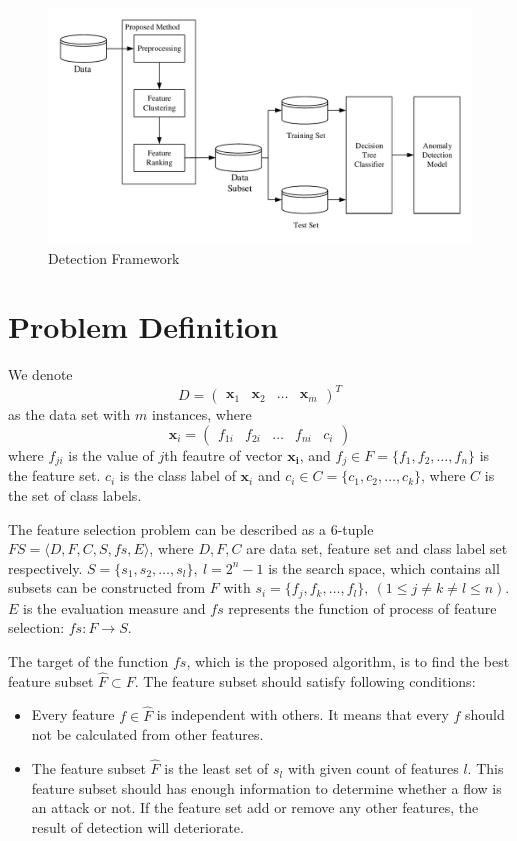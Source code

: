 \documentclass[journal]{IEEEtran}
\begin{document}
\begin{figure}[!htbp]
    \centering
    \includegraphics[scale=0.75]{fig/Framework.pdf}
    \caption{Detection Framework}
    \label{fig:framework}
\end{figure}

\section{Problem Definition}
\label{sec:problem}
We denote 
$$D=\left(\begin{array}{llll}
    \bm{x}_1 & \bm{x}_2 & \ldots & \bm{x}_m
\end{array}\right)^T$$
as the data set with $m$ instances, where 
$$\bm{x}_i = \left(\begin{array}{lllll}
    f_{1i} & f_{2i} & \ldots & f_{ni} & c_i
\end{array}\right)$$
where $f_{ji}$ is the value of $j$th feautre of vector $\bm{x_i}$, and $f_j \in F = \{f_1, f_2, \ldots, f_n\}$ is the feature set. $c_i$ is the class label of $\bm{x}_i$ and $c_i \in C = \{c_1, c_2, \ldots, c_k\}$, where $C$ is the set of class labels.

The feature selection problem\cite{Maza2018} can be described as a 6-tuple $FS=\langle D, F, C, S, fs, E \rangle$, where $D, F, C$ are data set, feature set and class label set respectively. $S=\{s_1, s_2, \ldots, s_l\}, \ l=2^n-1$ is the search space, which contains all subsets can be constructed from $F$ with $s_i=\{f_j, f_k, \ldots, f_l\}, \ (1 \leqslant j \neq k \neq l \leqslant n)$. $E$ is the evaluation measure and $fs$ represents the function of process of feature selection: $fs: F \rightarrow S$.

The target of the function $fs$, which is the proposed algorithm, is to find the best feature subset $\hat{F} \subset F$. The feature subset should satisfy following conditions:
\begin{itemize}
    \item Every feature $f \in \hat{F}$ is independent with others. It means that every $f$ should not be calculated from other features.
    \item The feature subset $\hat{F}$ is the least set of $s_l$ with given count of features $l$. This feature subset should has enough information to determine whether a flow is an attack or not. If the feature set add or remove any other features, the result of detection will deteriorate.
\end{itemize}
\end{document}
